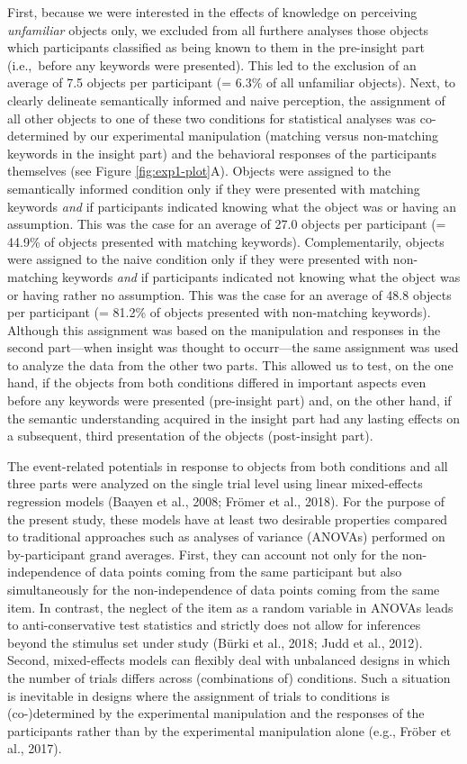\documentclass[
  english,
  doc,12pt,twoside,floatsintext]{apa7}
\begin{document}
First, because we were interested in the effects of knowledge on perceiving \emph{unfamiliar} objects only, we excluded from all furthere analyses those objects which participants classified as being known to them in the pre-insight part (i.e.,~before any keywords were presented). This led to the exclusion of an average of 7.5 objects per participant (= 6.3\% of all unfamiliar objects). Next, to clearly delineate semantically informed and naive perception, the assignment of all other objects to one of these two conditions for statistical analyses was co-determined by our experimental manipulation (matching versus non-matching keywords in the insight part) and the behavioral responses of the participants themselves (see Figure \ref{fig:exp1-plot}A). Objects were assigned to the semantically informed condition only if they were presented with matching keywords \emph{and} if participants indicated knowing what the object was or having an assumption. This was the case for an average of 27.0 objects per participant (= 44.9\% of objects presented with matching keywords). Complementarily, objects were assigned to the naive condition only if they were presented with non-matching keywords \emph{and} if participants indicated not knowing what the object was or having rather no assumption. This was the case for an average of 48.8 objects per participant (= 81.2\% of objects presented with non-matching keywords). Although this assignment was based on the manipulation and responses in the second part---when insight was thought to occurr---the same assignment was used to analyze the data from the other two parts. This allowed us to test, on the one hand, if the objects from both conditions differed in important aspects even before any keywords were presented (pre-insight part) and, on the other hand, if the semantic understanding acquired in the insight part had any lasting effects on a subsequent, third presentation of the objects (post-insight part).

The event-related potentials in response to objects from both conditions and all three parts were analyzed on the single trial level using linear mixed-effects regression models (Baayen et al., 2008; Frömer et al., 2018). For the purpose of the present study, these models have at least two desirable properties compared to traditional approaches such as analyses of variance (ANOVAs) performed on by-participant grand averages. First, they can account not only for the non-independence of data points coming from the same participant but also simultaneously for the non-independence of data points coming from the same item. In contrast, the neglect of the item as a random variable in ANOVAs leads to anti-conservative test statistics and strictly does not allow for inferences beyond the stimulus set under study (Bürki et al., 2018; Judd et al., 2012). Second, mixed-effects models can flexibly deal with unbalanced designs in which the number of trials differs across (combinations of) conditions. Such a situation is inevitable in designs where the assignment of trials to conditions is (co-)determined by the experimental manipulation and the responses of the participants rather than by the experimental manipulation alone (e.g., Fröber et al., 2017).
\end{document}
